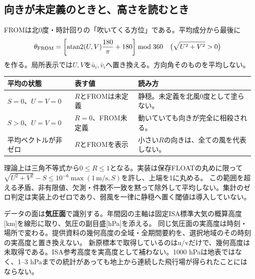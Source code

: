 \documentclass[11pt,a4paper]{article}
\begin{document}
\subsection{向きが未定義のときと、高さを読むとき}
FROMは北0度・時計回りの「吹いてくる方位」である。平均成分から最後に
\begin{equation}
 \theta_{\rm FROM}=\left[\operatorname{atan2}(U,V)\frac{180}{\pi}+180\right]\bmod360
 \quad\bigl(\sqrt{U^2+V^2}>0\bigr)
 \label{eq:climate-from}
\end{equation}
を作る。局所表示では$U,V$を$\bar u_i,\bar v_i$へ置き換える。方向角そのものを平均しない。
\begin{center}\small
\begin{tabular}{@{}p{40mm}p{39mm}p{77mm}@{}}
\toprule 平均の状態 & 表す値 & 読み方 \\\midrule
$S=0$、$U=V=0$ & $R$とFROMは未定義 & 静穏。未定義を北風0度として塗らない。\\
$S>0$、$U=V=0$ & $R=0$、FROM未定義 & 動いていても向きが完全に相殺される。\\
平均ベクトルが非ゼロ & $R$とFROMを表示 & 小さい$R$の向きは、全ての風を代表しない。\\\bottomrule
\end{tabular}
\end{center}
理論上は三角不等式から$0\leq R\leq1$となる。実装は保存FLOATの丸めに限って$\sqrt{U^2+V^2}-S\leq10^{-6}\max(1\,\mathrm{m/s},S)$を許し、上端を1に丸める。
この範囲を超える矛盾、非有限値、欠測・件数不一致を黙って除外して平均しない。集計のゼロ判定は実装上のゼロであり、弱風を一律に静穏へ置く閾値は導入していない。

データの面は\textbf{気圧面}で識別する。年間図の主軸は固定ISA標準大気の概算高度[km]を線形に取り、気圧の副目盛[hPa]を添える。
同じ気圧面の実高度は時刻・場所で変わる。提供資料の幾何高度の全域・全期間要約を、選択地域のその時刻の実高度と置き換えない。
新原標本で取得しているのはu/vだけで、幾何高度は未取得である。ISA参考高度を実高度として補わない。1000 hPaは地表ではなく、1--3 hPaまでの統計があっても地上から連続した飛行場が得られたことにはならない。
\end{document}
